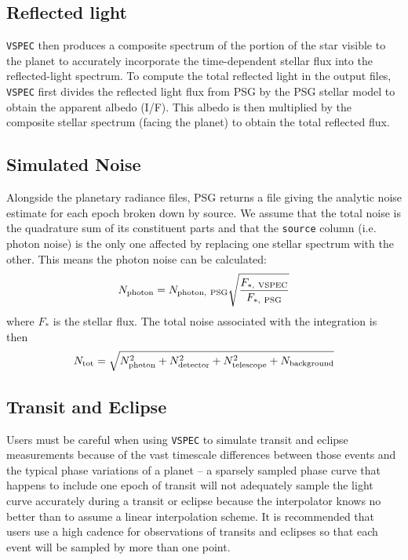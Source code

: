 \documentclass[twocolumn,linenumbers]{aastex631}
\newcommand{\vspec}[1]{\texttt{VSPEC}#1}
\begin{document}
\subsection{Reflected light}
\vspec{} then produces a composite spectrum of the portion of the star visible to the planet to accurately incorporate the time-dependent stellar flux into the reflected-light spectrum. To compute the total reflected light in the output files, \vspec{} first divides the reflected light flux from PSG by the PSG stellar model to obtain the apparent albedo (I/F). This albedo is then multiplied by the composite stellar spectrum (facing the planet) to obtain the total reflected flux.

\subsection{Simulated Noise}
Alongside the planetary radiance files, PSG returns a file giving the analytic noise estimate for each epoch broken down by source. We assume that the total noise is the quadrature sum of its constituent parts and that the \texttt{source} column (i.e. photon noise) is the only one affected by replacing one stellar spectrum with the other. This means the photon noise can be calculated:
\begin{equation}
    N_{\rm photon} = N_{\rm photon,~PSG} \sqrt{\frac{F_{*,\rm ~VSPEC}}{F_{*,\rm ~PSG}}}
\end{equation}
where $F_*$ is the stellar flux. The total noise associated with the integration is then
\begin{equation}
    N_{\rm tot} = \sqrt{
        N_{\rm photon}^2 + N_{\rm detector}^2 + N_{\rm telescope}^2 + N_{\rm background}
    }
\end{equation}

\subsection{Transit and Eclipse}
Users must be careful when using \vspec{} to simulate transit and eclipse measurements because of the vast timescale differences between those events and the typical phase variations of a planet -- a sparsely sampled phase curve that happens to include one epoch of transit will not adequately sample the light curve accurately during a transit or eclipse because the interpolator knows no better than to assume a linear interpolation scheme. It is recommended that users use a high cadence for observations of transits and eclipses so that each event will be sampled by more than one point.
\end{document}
